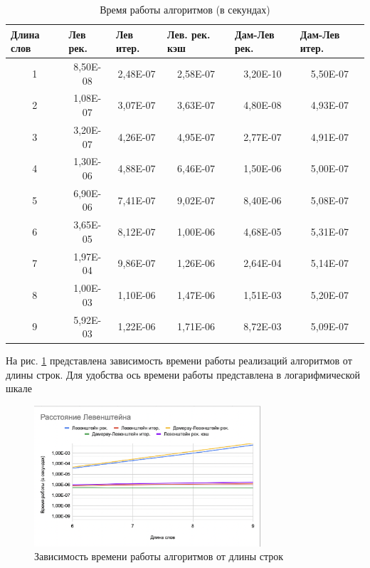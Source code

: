 \documentclass[14pt,russian]{scrartcl}
\begin{document}
	\begin{table}[htb]
		\caption{\centering Время работы алгоритмов (в секундах)}
		\centering
		\begin{tabular}{|c|c|c|c|c|c|}
		\hline
		\multicolumn{1}{|l|}{Длина слов} &
		  \multicolumn{1}{l|}{Лев рек.} &
		  \multicolumn{1}{l|}{Лев итер.} &
		  \multicolumn{1}{l|}{Лев. рек. кэш} &
		  \multicolumn{1}{l|}{Дам-Лев рек.} &
		  \multicolumn{1}{l|}{Дам-Лев итер.} \\ \hline
		1 & 8,50E-08 & 2,48E-07 & 2,58E-07 & 3,20E-10 & 5,50E-07 \\ \hline
		2 & 1,08E-07 & 3,07E-07 & 3,63E-07 & 4,80E-08 & 4,93E-07 \\ \hline
		3 & 3,20E-07 & 4,26E-07 & 4,95E-07 & 2,77E-07 & 4,91E-07 \\ \hline
		4 & 1,30E-06 & 4,88E-07 & 6,46E-07 & 1,50E-06 & 5,00E-07 \\ \hline
		5 & 6,90E-06 & 7,41E-07 & 9,02E-07 & 8,40E-06 & 5,08E-07 \\ \hline
		6 & 3,65E-05 & 8,12E-07 & 1,00E-06 & 4,68E-05 & 5,31E-07 \\ \hline
		7 & 1,97E-04 & 9,86E-07 & 1,26E-06 & 2,64E-04 & 5,14E-07 \\ \hline
		8 & 1,00E-03 & 1,10E-06 & 1,47E-06 & 1,51E-03 & 5,20E-07 \\ \hline
		9 & 5,92E-03 & 1,22E-06 & 1,71E-06 & 8,72E-03 & 5,09E-07 \\ \hline
		\end{tabular}
		\label{tab:bench}
		\end{table}

	\pagebreak

	На рис. \ref{fig:plot} представлена зависимость времени работы реализаций алгоритмов от длины строк. Для удобства ось времени работы представлена в логарифмической шкале
	
	
	\begin{figure}[ht]
		\centering
		\includegraphics[width=0.75\textwidth]{plot.png}
		\caption{Зависимость времени работы алгоритмов от длины строк}
		\label{fig:plot}
	\end{figure}
\end{document}
